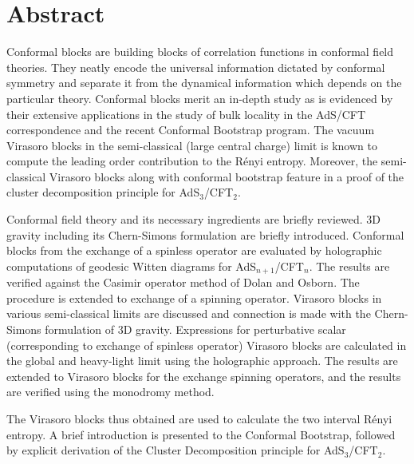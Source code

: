 \chapter*{Abstract}
Conformal blocks are building blocks of correlation functions in conformal field theories. They neatly encode the universal information dictated by conformal symmetry and separate it from the dynamical information which depends on the particular theory. Conformal blocks merit an in-depth study as is evidenced by their extensive applications in the study of bulk locality in the AdS/CFT correspondence and the recent Conformal Bootstrap program. The vacuum Virasoro blocks in the semi-classical (large central charge) limit is known to compute the leading order contribution to the R\'{e}nyi entropy. Moreover, the semi-classical Virasoro blocks along with conformal bootstrap feature in a proof of the cluster decomposition principle for AdS$_3$/CFT$_2$. 


Conformal field theory and its necessary ingredients are briefly reviewed. 3D gravity including its Chern-Simons formulation are briefly introduced. Conformal blocks from the exchange of a spinless operator are evaluated by holographic computations of geodesic Witten diagrams for AdS$_{n+1}$/CFT$_n$. The results are verified against the Casimir operator method of Dolan and Osborn. The procedure is extended to exchange of a spinning operator. Virasoro blocks in various semi-classical limits are discussed and connection is made with the Chern-Simons formulation of 3D gravity. Expressions for perturbative scalar (corresponding to exchange of spinless operator) Virasoro blocks are calculated in the global and heavy-light limit using the holographic approach. The results are extended to Virasoro blocks for the exchange spinning operators, and the results are verified using the monodromy method.


The Virasoro blocks thus obtained are used to calculate the two interval R\'{e}nyi entropy. A brief introduction is presented to the Conformal Bootstrap, followed by explicit derivation of the Cluster Decomposition principle for AdS$_3$/CFT$_2$.




\iffalse
The focus in the first part is on providing the relevent background. Starting with an introduction to the necessary ingredients from conformal field theory, including Zomolodchokov's recursion relations. Mellin representations of conformal correlation functions and Witten diagrams are discussed. Virasoro blocks are discussed in the different semi-classical limits. Perturbative Virasoro blocks corresponding to the exchange of a spin-less operator are computed in the heavy-light and global limits. The results are extended to Virasoro blocks arising from the exchange of an operator carrying spin. The calculations are done using AdS$_3$/CFT$_2$ holographic computations. For the heavy-light limit, the idea is calculating geodesic Witten diagrams for the light operators interacting in a background created by letting the heavy operators backreact. The geometry thus obtained can be either a BTZ black hole or a conical defect in AdS$_3$.

Lastly, applications to calculating two interval R\'{e}nyi entropy are discussed. Also, using the Conformal Bootstrap to constrain operator dimensions in CFTs is briefly introduced.
\fi
